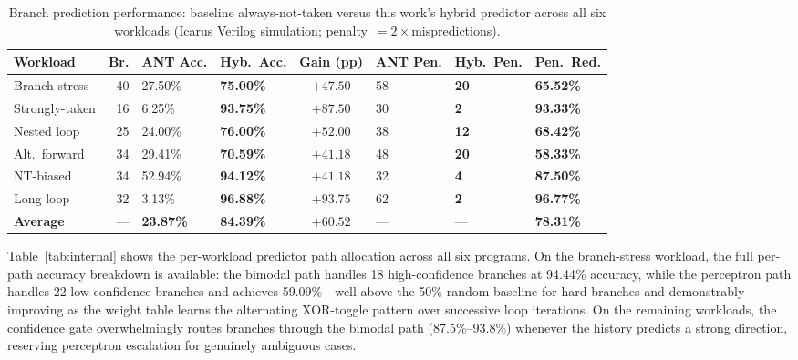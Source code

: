 \documentclass[12pt,a4paper]{article}
\begin{document}
\begin{table}[htbp]
  \centering
  \caption{Branch prediction performance: baseline always-not-taken versus
           this work's hybrid predictor across all six workloads
           (Icarus Verilog simulation; penalty~$=2\times$mispredictions).}
  \label{tab:results}
  \begin{tabularx}{\linewidth}{p{2.0cm}rYYcYYY}
    \toprule
    \textbf{Workload} & \textbf{Br.}
      & \textbf{ANT Acc.}
      & \textbf{Hyb.\ Acc.}
      & \textbf{Gain (pp)}
      & \textbf{ANT Pen.}
      & \textbf{Hyb.\ Pen.}
      & \textbf{Pen.\ Red.} \\
    \midrule
    Branch-stress  & 40 & 27.50\% & \textbf{75.00\%} & $+47.50$ & 58 & \textbf{20} & \textbf{65.52\%} \\
    Strongly-taken & 16 &  6.25\% & \textbf{93.75\%} & $+87.50$ & 30 & \textbf{ 2} & \textbf{93.33\%} \\
    Nested loop    & 25 & 24.00\% & \textbf{76.00\%} & $+52.00$ & 38 & \textbf{12} & \textbf{68.42\%} \\
    Alt.\ forward  & 34 & 29.41\% & \textbf{70.59\%} & $+41.18$ & 48 & \textbf{20} & \textbf{58.33\%} \\
    NT-biased      & 34 & 52.94\% & \textbf{94.12\%} & $+41.18$ & 32 & \textbf{ 4} & \textbf{87.50\%} \\
    Long loop      & 32 &  3.13\% & \textbf{96.88\%} & $+93.75$ & 62 & \textbf{ 2} & \textbf{96.77\%} \\
    \midrule
    \textbf{Average} & --- & \textbf{23.87\%} & \textbf{84.39\%}
      & $\mathbf{+60.52}$ & --- & --- & \textbf{78.31\%} \\
    \bottomrule
  \end{tabularx}
\end{table}

Table~\ref{tab:internal} shows the per-workload predictor path allocation
across all six programs.
On the branch-stress workload, the full per-path accuracy breakdown is
available: the bimodal path handles 18 high-confidence branches at 94.44\%
accuracy, while the perceptron path handles 22 low-confidence branches and
achieves 59.09\%---well above the 50\% random baseline for hard branches and
demonstrably improving as the weight table learns the alternating XOR-toggle
pattern over successive loop iterations.
On the remaining workloads, the confidence gate overwhelmingly routes branches
through the bimodal path (87.5\%--93.8\%) whenever the history predicts a
strong direction, reserving perceptron escalation for genuinely ambiguous cases.
\end{document}
